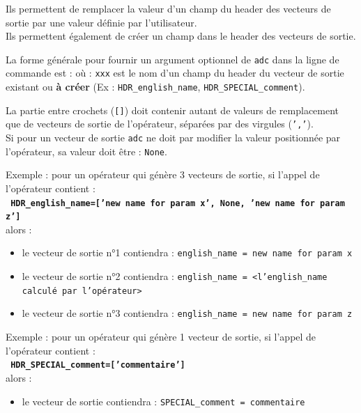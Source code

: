 Ils permettent de remplacer la valeur d'un champ du header des vecteurs de
sortie par une valeur définie par l'utilisateur. \\
Ils permettent également de créer un champ dans le header des vecteurs de
sortie.
\medbreak

La forme générale pour fournir un argument optionnel de \texttt{adc} dans la
ligne de commande est : 
\medbreak
  où : \texttt{xxx} est le nom d'un champ du header du vecteur de sortie
  existant ou \textbf{à créer} (Ex : \texttt{HDR\_english\_name},
  \texttt{HDR\_SPECIAL\_comment}).
\medbreak

La partie entre crochets (\texttt{[]}) doit contenir autant de valeurs
de remplacement que de vecteurs de sortie de l'opérateur, séparées par des
virgules (\texttt{','}). \\
Si pour un vecteur de sortie \texttt{adc} ne doit par modifier la valeur
positionnée par l'opérateur, sa valeur doit être : \texttt{None}. \\
\medbreak

Exemple : pour un opérateur qui génère 3 vecteurs de sortie, si l'appel de
l'opérateur contient : \\
\textbf{\texttt{ HDR\_english\_name=['new name for param x', None, 'new name for param z']}} \\
alors : \\
\begin{itemize}
  \item[•] le vecteur de sortie n°1 contiendra :
	       \texttt{english\_name = new name for param x}
  \item[•] le vecteur de sortie n°2 contiendra :
           \texttt{english\_name = <l'english\_name calculé par l'opérateur>}
  \item[•] le vecteur de sortie n°3 contiendra :
           \texttt{english\_name = new name for param z}
\end{itemize}
\medbreak

Exemple : pour un opérateur qui génère 1 vecteur de sortie, si l'appel de
l'opérateur contient : \\
\textbf{\texttt{ HDR\_SPECIAL\_comment=['commentaire'] }} \\
alors : \\
\begin{itemize}
  \item[•] le vecteur de sortie contiendra : \texttt{SPECIAL\_comment = commentaire}
\end{itemize}
\medbreak


